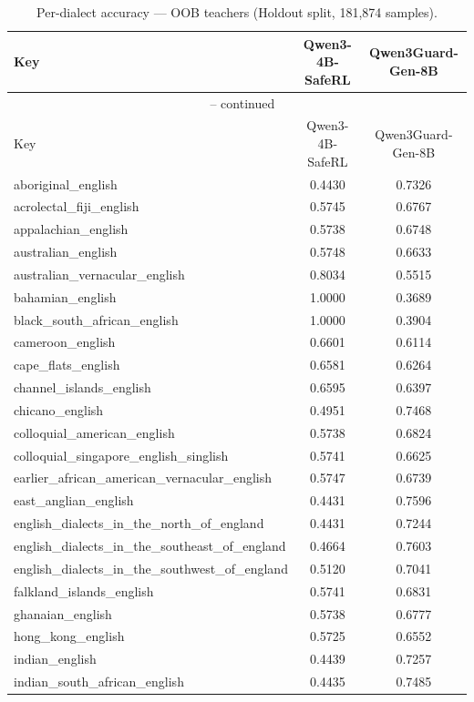 \begin{landscape}
\begin{longtable}{lcc}
\caption{Per-dialect accuracy — OOB teachers (Holdout split, 181{,}874 samples).} \\
\label{tab:oob_teachers_per_dialect_holdout}
\toprule
Key & Qwen3-4B-SafeRL & Qwen3Guard-Gen-8B \\
\midrule
\endfirsthead
\multicolumn{3}{c}{\tablename\ \thetable{} -- continued} \\
\toprule
Key & Qwen3-4B-SafeRL & Qwen3Guard-Gen-8B \\
\midrule
\endhead
aboriginal\_english & 0.4430 & 0.7326 \\
acrolectal\_fiji\_english & 0.5745 & 0.6767 \\
appalachian\_english & 0.5738 & 0.6748 \\
australian\_english & 0.5748 & 0.6633 \\
australian\_vernacular\_english & 0.8034 & 0.5515 \\
bahamian\_english & 1.0000 & 0.3689 \\
black\_south\_african\_english & 1.0000 & 0.3904 \\
cameroon\_english & 0.6601 & 0.6114 \\
cape\_flats\_english & 0.6581 & 0.6264 \\
channel\_islands\_english & 0.6595 & 0.6397 \\
chicano\_english & 0.4951 & 0.7468 \\
colloquial\_american\_english & 0.5738 & 0.6824 \\
colloquial\_singapore\_english\_singlish & 0.5741 & 0.6625 \\
earlier\_african\_american\_vernacular\_english & 0.5747 & 0.6739 \\
east\_anglian\_english & 0.4431 & 0.7596 \\
english\_dialects\_in\_the\_north\_of\_england & 0.4431 & 0.7244 \\
english\_dialects\_in\_the\_southeast\_of\_england & 0.4664 & 0.7603 \\
english\_dialects\_in\_the\_southwest\_of\_england & 0.5120 & 0.7041 \\
falkland\_islands\_english & 0.5741 & 0.6831 \\
ghanaian\_english & 0.5738 & 0.6777 \\
hong\_kong\_english & 0.5725 & 0.6552 \\
indian\_english & 0.4439 & 0.7257 \\
indian\_south\_african\_english & 0.4435 & 0.7485 \\

\end{longtable}
\end{landscape}
